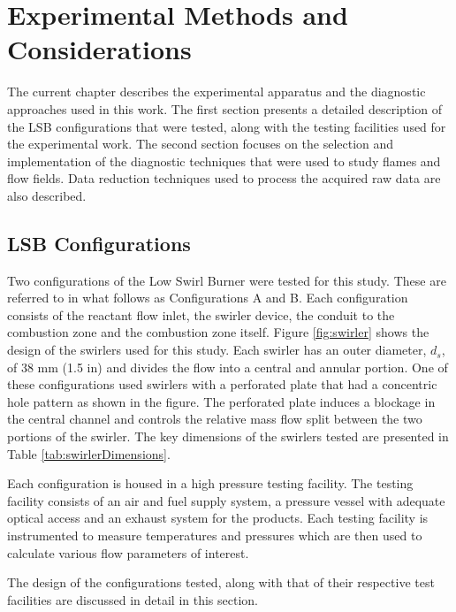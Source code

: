 \chapter{Experimental Methods and Considerations}
\label{ch:experimental}

The current chapter describes the experimental apparatus and the diagnostic approaches used in this work.
The first section presents a detailed description of the LSB configurations that were tested, along with the testing facilities used for the experimental work.
The second section focuses on the selection and implementation of the diagnostic techniques that were used to study flames and flow fields.
Data reduction techniques used to process the acquired raw data are also described.

\section{LSB Configurations}
\label{sec:experimental-lsb-configurations}

Two configurations of the Low Swirl Burner were tested for this study.
These are referred to in what follows as Configurations A and B.
Each configuration consists of the reactant flow inlet, the swirler device, the conduit to the combustion zone and the combustion zone itself.
Figure \ref{fig:swirler} shows the design of the swirlers used for this study.
Each swirler has an outer diameter, \(d_s\), of 38 mm (1.5 in) and divides the flow into a central and annular portion.
One of these configurations used swirlers with a perforated plate that had a concentric hole pattern as shown in the figure.
The perforated plate induces a blockage in the central channel and controls the relative mass flow split between the two portions of the swirler.
The key dimensions of the swirlers tested are presented in Table \ref{tab:swirlerDimensions}.

Each configuration is housed in a high pressure testing facility.
The testing facility consists of an air and fuel supply system, a pressure vessel with adequate optical access and an exhaust system for the products.
Each testing facility is instrumented to measure temperatures and pressures which are then used to calculate various flow parameters of interest.

The design of the configurations tested, along with that of their respective test facilities are discussed in detail in this section.



